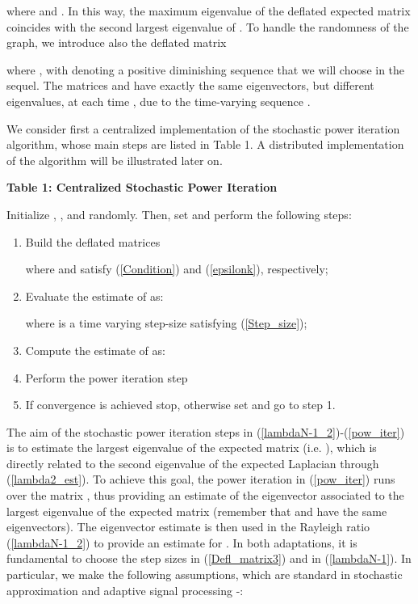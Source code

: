 \documentclass[10pt,twocolumn]{IEEEtran}
\begin{document}
where  and . In this way, the maximum eigenvalue of the deflated expected matrix  coincides with the second largest eigenvalue of .
To handle the randomness of the graph, we introduce also the deflated matrix

where , with  denoting a positive diminishing sequence that we will choose in the sequel. The matrices  and  have exactly the same eigenvectors, but different eigenvalues,
at each time , due to the time-varying sequence .

We consider first a centralized implementation of the stochastic power iteration algorithm, whose main steps
are listed in Table 1. A distributed implementation of the algorithm will be illustrated later on.
\begin{algorithm}
\caption*{\textbf{Table 1: Centralized Stochastic Power Iteration}}

\vspace{.2cm}
Initialize , , and  randomly. Then, set  and perform the following steps:
\begin{enumerate}
  \item Build the deflated matrices
        
        where  and  satisfy (\ref{Condition}) and (\ref{epsilonk}), respectively;
  \item Evaluate the estimate  of  as:
        
        where  is a time varying step-size satisfying (\ref{Step_size});
  \item Compute the estimate  of  as:
       
  \item Perform the power iteration step
        
  \item If convergence is achieved stop, otherwise set  and go to step 1.
\end{enumerate}
\end{algorithm}

The aim of the stochastic power iteration steps in (\ref{lambdaN-1_2})-(\ref{pow_iter}) is to estimate the largest eigenvalue of the expected matrix  (i.e. ), which is directly related to the second eigenvalue  of the expected Laplacian through (\ref{lambda2_est}). To achieve this goal, the power iteration in (\ref{pow_iter}) runs over the matrix , thus providing an estimate  of the eigenvector  associated to the largest eigenvalue of the expected matrix  (remember that  and  have the same eigenvectors).
The eigenvector estimate  is then used in the Rayleigh ratio (\ref{lambdaN-1_2}) to provide an estimate  for .
In both adaptations, it is fundamental to choose the step sizes  in (\ref{Defl_matrix3}) and  in (\ref{lambdaN-1}).
In particular,  we make the following assumptions, which are standard in stochastic approximation and adaptive signal processing \cite{Sayed}-\cite{Nevel}:
\end{document}
